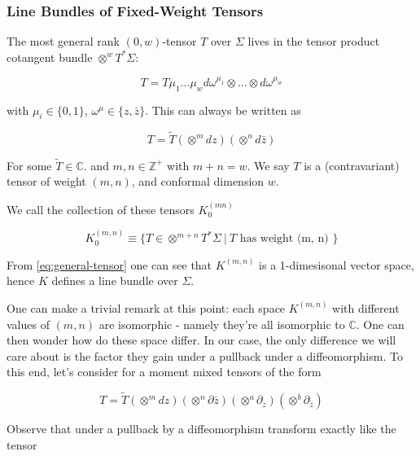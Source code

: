 \subsubsection{Line Bundles of Fixed-Weight Tensors}

    The most general rank $(0, w)$-tensor $T$ over $\Sigma$ lives in the tensor product cotangent bundle $\otimes^w T^*\Sigma$:

    \begin{equation}
        T = T{\mu_1 ... \mu_w} d\omega^{\mu_1}\otimes ... \otimes d\omega^{\mu_w}
    \end{equation}

    with $\mu_i \in \{0, 1\}$, $\omega^\mu \in \{z, \bar z\}$. This can always be written as

    \begin{equation}
        T = \tilde T(\otimes^m dz) (\otimes^n d \bar z)
        \label{eq:general-tensor}
    \end{equation}

    For some  $\tilde T \in \mathbb C$. and $m, n \in \mathbb Z^+$ with $m + n = w$. We say $T$ is a (contravariant) tensor of weight $(m, n)$, and conformal dimension $w$.

    We call the collection of these tensors $K_0^{(m n)}$

    \begin{equation}
        K_0^{(m, n)} \equiv \{ T \in \otimes^{m + n} T^*\Sigma ~|~ T \text{ has weight (m, n) }\}
    \end{equation}

    From \ref{eq:general-tensor} one can see that $K^{(m, n)}$ is a 1-dimesisonal vector space, hence $K$ defines a line bundle over $\Sigma$.

    One can make a trivial remark at this point: each space $K^{(m, n)}$ with different values of $(m,n)$ are isomorphic - namely they're all isomorphic to $\mathbb C$. One can then wonder how do these space differ. In our case, the only difference we will care about is the factor they gain under a pullback under a diffeomorphism. To this end, let's consider for a moment mixed tensors of the form

    \begin{equation}
        T = \tilde T(\otimes^m dz) (\otimes^n \partial \bar z) (\otimes^a \partial_z) (\otimes^b \partial_{\bar z})
    \end{equation}

    Observe that under a pullback by a diffeomorphism transform exactly like the tensor

